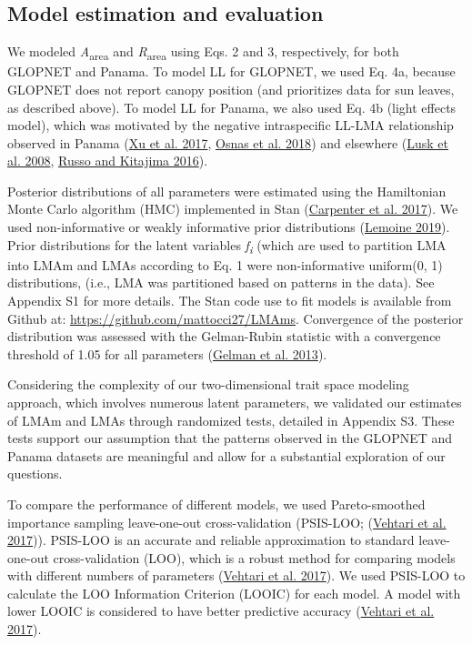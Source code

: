 \documentclass[
  12pt,
  letterpaper,
  DIV=11,
  numbers=noendperiod]{scrartcl}
\begin{document}
\hypertarget{model-estimation-and-evaluation}{%
\subsection{Model estimation and
evaluation}\label{model-estimation-and-evaluation}}

We modeled \emph{A}\textsubscript{area} and \emph{R}\textsubscript{area}
using Eqs. 2 and 3, respectively, for both GLOPNET and Panama. To model
LL for GLOPNET, we used Eq. 4a, because GLOPNET does not report canopy
position (and prioritizes data for sun leaves, as described above). To
model LL for Panama, we also used Eq. 4b (light effects model), which
was motivated by the negative intraspecific LL-LMA relationship observed
in Panama (\protect\hyperlink{ref-Xu2017}{Xu et al. 2017},
\protect\hyperlink{ref-Osnas2018}{Osnas et al. 2018}) and elsewhere
(\protect\hyperlink{ref-Lusk2008}{Lusk et al. 2008},
\protect\hyperlink{ref-Russo2016}{Russo and Kitajima 2016}).

Posterior distributions of all parameters were estimated using the
Hamiltonian Monte Carlo algorithm (HMC) implemented in Stan
(\protect\hyperlink{ref-Carpenter2017}{Carpenter et al. 2017}). We used
non-informative or weakly informative prior distributions
(\protect\hyperlink{ref-Lemoine2019}{Lemoine 2019}). Prior distributions
for the latent variables \emph{f\textsubscript{i}} (which are used to
partition LMA into LMAm and LMAs according to Eq. 1 were non-informative
uniform(0, 1) distributions, (i.e., LMA was partitioned based on
patterns in the data). See Appendix S1 for more details. The Stan code
use to fit models is available from Github at:
\url{https://github.com/mattocci27/LMAms}. Convergence of the posterior
distribution was assessed with the Gelman-Rubin statistic with a
convergence threshold of 1.05 for all parameters
(\protect\hyperlink{ref-Gelman2013}{Gelman et al. 2013}).

Considering the complexity of our two-dimensional trait space modeling
approach, which involves numerous latent parameters, we validated our
estimates of LMAm and LMAs through randomized tests, detailed in
Appendix S3. These tests support our assumption that the patterns
observed in the GLOPNET and Panama datasets are meaningful and allow for
a substantial exploration of our questions.

To compare the performance of different models, we used Pareto-smoothed
importance sampling leave-one-out cross-validation (PSIS-LOO;
(\protect\hyperlink{ref-Vehtari2017}{Vehtari et al. 2017})). PSIS-LOO is
an accurate and reliable approximation to standard leave-one-out
cross-validation (LOO), which is a robust method for comparing models
with different numbers of parameters
(\protect\hyperlink{ref-Vehtari2017}{Vehtari et al. 2017}). We used
PSIS-LOO to calculate the LOO Information Criterion (LOOIC) for each
model. A model with lower LOOIC is considered to have better predictive
accuracy (\protect\hyperlink{ref-Vehtari2017}{Vehtari et al. 2017}).
\end{document}
